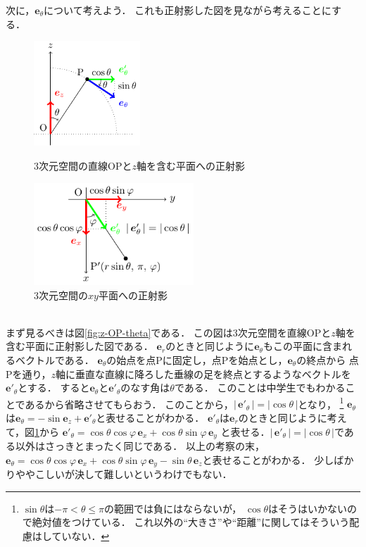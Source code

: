 次に，$\bm{e}_\theta$について考えよう．
これも正射影した図を見ながら考えることにする．
\begin{figure}[h]
 \begin{minipage}{0.5\hsize}
  \begin{center}
   \includegraphics[width=4cm]{picture/vecter26}
  \end{center}
 \caption{3次元空間の直線OPと$z$軸を含む平面への正射影}
 \label{fig:z-OP-theta}
\end{minipage}
\begin{minipage}{0.5\hsize}
  \begin{center}
   \includegraphics[width=6cm]{picture/vecter27}
  \end{center}
 \caption{3次元空間の$xy$平面への正射影}
 \label{fig:3dxy-theta}
\end{minipage}
\end{figure} \\
まず見るべきは図\ref{fig:z-OP-theta}である．
この図は3次元空間を直線OPと$z$軸を含む平面に正射影した図である．
$\bm{e}_r$のときと同じように$\bm{e}_\theta$もこの平面に含まれるベクトルである．
$\bm{e}_\theta$の始点を点Pに固定し，点Pを始点とし，$\bm{e}_\theta$の終点から
点Pを通り，$z$軸に垂直な直線に降ろした垂線の足を終点とするようなベクトルを$\bm{e}'_\theta$とする．
すると$\bm{e}_\theta$と$\bm{e}'_\theta$のなす角は$\theta$である．
このことは中学生でもわかることであるから省略させてもらおう．
このことから，$| \, \bm{e}'_\theta \, | = | \cos \theta \, |$となり，
\footnote{$\sin \theta$は$- \pi < \theta \leq \pi $の範囲では負にはならないが，
$\cos \theta$はそうはいかないので絶対値をつけている．
これ以外の``大きさ''や``距離''に関してはそういう配慮はしていない．}
$\bm{e}_\theta$は$\bm{e}_\theta = - \sin \bm{e}_z + \bm{e}'_\theta$と表せることがわかる．
$\bm{e}'_\theta$は$\bm{e}_r$のときと同じように考えて，図\ref{fig:3dxy-theta}から
$\bm{e}'_\theta = \cos \theta \cos \varphi \, \bm{e}_x + \cos \theta \sin \varphi \, \bm{e}_y$
と表せる．$| \, \bm{e}'_\theta \, | = | \cos \theta \, |$である以外はさっきとまったく同じである．
以上の考察の末，$\bm{e}_\theta = \cos \theta \cos \varphi \, \bm{e}_x 
+ \cos \theta \sin \varphi \, \bm{e}_y - \sin \theta \, \bm{e}_z$と表せることがわかる．
少しばかりややこしいが決して難しいというわけでもない．

